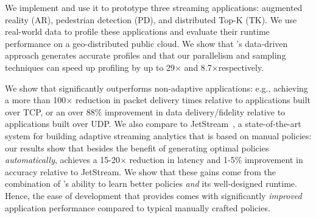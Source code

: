 \begin{enumerate}[leftmargin=*, topsep=3pt]
\end{enumerate}

We implement \sysname{} and use it to prototype three streaming applications:
augmented reality (AR), pedestrian detection (PD), and distributed Top-K
(TK). We use real-world data to profile these applications and evaluate their
runtime performance on a geo-distributed public cloud.  We show that
\sysname{}'s data-driven approach generates accurate profiles and that our
parallelism and sampling techniques can speed up profiling by up to 29$\times$
and 8.7$\times$\@ respectively.

We show that \sysname{} significantly outperforms non-adaptive applications:
e.g., achieving a more than 100$\times$ reduction in packet delivery times
relative to applications built over TCP, or an over 88\% improvement in data
delivery/fidelity relative to applications built over UDP.  We also compare
\sysname{} to JetStream~\cite{rabkin2014aggregation}, a state-of-the-art system
for building adaptive streaming analytics that is based on manual policies: our
results show that besides the benefit of generating optimal policies
\textit{automatically}, \sysname{} achieves a 15-20$\times$ reduction in latency
and 1-5\% improvement in accuracy relative to JetStream. We show that these
gains come from the combination of \sysname{}'s ability to learn better policies
\emph{and} its well-designed runtime.  Hence, the ease of development that
\sysname{} provides comes with significantly \emph{improved} application
performance compared to typical manually crafted policies.

